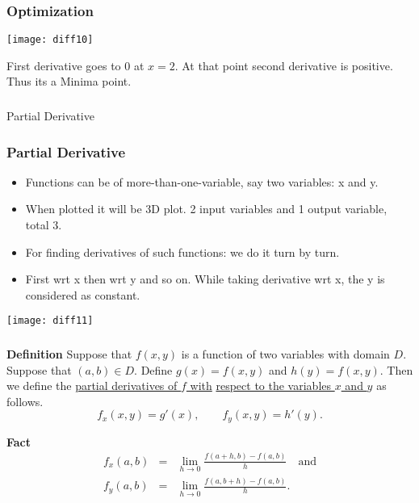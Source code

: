  \begin{frame}[fragile] \frametitle{Optimization}

\begin{center}
\texttt{[image: diff10]}
\end{center}
First derivative goes to 0 at $x=2$. At that point second derivative is positive. Thus its a Minima point.

\end{frame}









\begin{frame}[fragile]\frametitle{}
\begin{center}
{\Large Partial Derivative}
\end{center}
\end{frame}


 \begin{frame}[fragile] \frametitle{Partial Derivative}
\begin{itemize}
\item Functions can be of more-than-one-variable, say two variables: x and y. 
\item When plotted it will be 3D plot. 2 input variables and 1 output variable, total 3.
\item For finding derivatives of such functions: we do it turn by turn. 
\item First wrt x then wrt y and so on. While taking derivative wrt x, the y is considered as constant.
\end{itemize}
\begin{center}
\texttt{[image: diff11]}
\end{center}
\end{frame}


\begin{frame}[fragile]\frametitle{}
\textbf{Definition}
 Suppose that $f(x,y)$ is a function of two variables with domain $D$.  Suppose that $(a,b)\in D$.  Define $g(x)=f(x,y)$ and $h(y)=f(x,y)$.  Then we define the \underline{partial derivatives of $f$ with} \underline{respect to the variables $x$ and $y$} as follows.
 $$
 f_x(x,y) = g'(x), \qquad f_y(x,y) = h'(y).
 $$


\textbf{Fact}
\begin{eqnarray*}
  f_x(a,b) &=& \lim_{h\rightarrow 0} \frac{f(a+h,b)-f(a,b)}{h}    \quad \mbox{and} \\
  f_y(a,b) &=& \lim_{h\rightarrow 0} \frac{f(a,b+h)-f(a,b)}{h}.
\end{eqnarray*}  
 
\end{frame}


